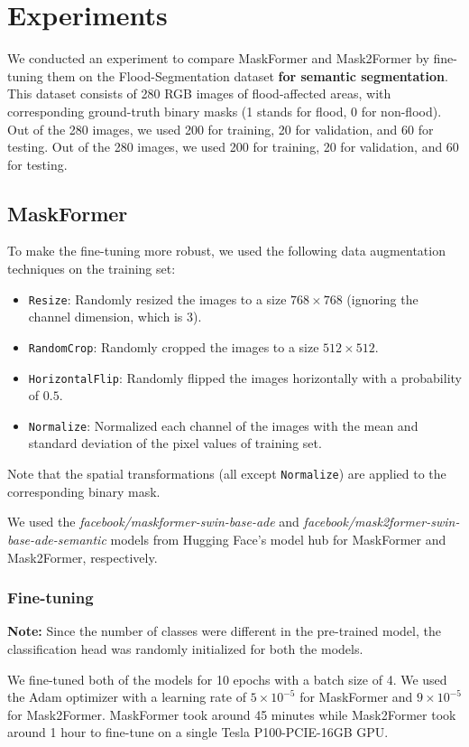 \section{Experiments}
\label{sec:experiments}
We conducted an experiment to compare MaskFormer and Mask2Former by fine-tuning them on the Flood-Segmentation dataset \cite{md_faizal_karim_krish_sharma_niyar_r_barman_2022} \textbf{for semantic segmentation}. This dataset consists of 280 RGB images of flood-affected areas, with corresponding ground-truth binary masks (1 stands for flood, 0 for non-flood). Out of the 280 images, we used 200 for training, 20 for validation, and 60 for testing. Out of the 280 images, we used 200 for training, 20 for validation, and 60 for testing.

\subsection{MaskFormer}
To make the fine-tuning more robust, we used the following data augmentation techniques on the training set:
\begin{itemize}
    \item \texttt{Resize}: Randomly resized the images to a size $768\times768$ (ignoring the channel dimension, which is 3).
    \item \texttt{RandomCrop}: Randomly cropped the images to a size $512\times512$.
    \item \texttt{HorizontalFlip}: Randomly flipped the images horizontally with a probability of $0.5$.
    \item \texttt{Normalize}: Normalized each channel of the images with the mean and standard deviation of the pixel values of training set.
\end{itemize}
Note that the spatial transformations (all except \texttt{Normalize}) are applied to the corresponding binary mask.

We used the \textit{facebook/maskformer-swin-base-ade} and \textit{facebook/mask2former-swin-base-ade-semantic} models from Hugging Face's model hub for MaskFormer and Mask2Former, respectively.

\subsubsection*{Fine-tuning}
\textbf{Note:} Since the number of classes were different in the pre-trained model, the classification head was randomly initialized for both the models.

We fine-tuned both of the models for 10 epochs with a batch size of 4. We used the Adam optimizer \cite{kingma2017adammethodstochasticoptimization} with a learning rate of $5\times10^{-5}$ for MaskFormer and $9\times10^{-5}$ for Mask2Former. MaskFormer took around 45 minutes while Mask2Former took around 1 hour to fine-tune on a single Tesla P100-PCIE-16GB GPU.

